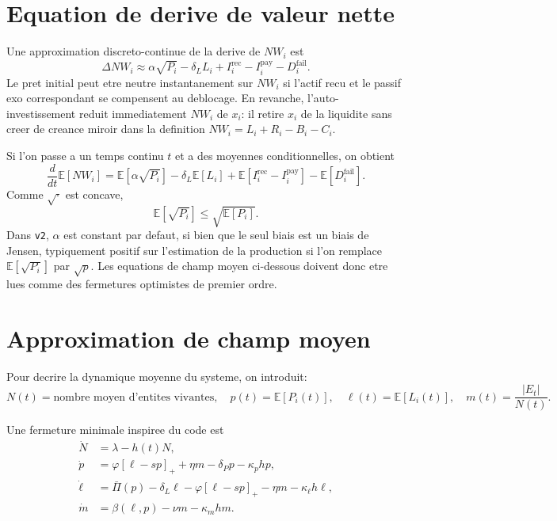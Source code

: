 \documentclass[11pt,a4paper]{article}
\begin{document}
\section{Equation de derive de valeur nette}
Une approximation discreto-continue de la derive de $NW_i$ est
\[
\Delta NW_i
\approx
\alpha\sqrt{P_i}
- \delta_L L_i
+ I_i^{\mathrm{rec}}
- I_i^{\mathrm{pay}}
- D_i^{\mathrm{fail}}.
\]
Le pret initial peut etre neutre instantanement sur $NW_i$ si l'actif recu et le passif exo correspondant se compensent au deblocage. En revanche, l'auto-investissement reduit immediatement $NW_i$ de $x_i$: il retire $x_i$ de la liquidite sans creer de creance miroir dans la definition $NW_i=L_i+R_i-B_i-C_i$.

Si l'on passe a un temps continu $t$ et a des moyennes conditionnelles, on obtient
\[
\frac{d}{dt}\mathbb{E}[NW_i]
=
\mathbb{E}[\alpha\sqrt{P_i}]
- \delta_L\mathbb{E}[L_i]
+ \mathbb{E}[I_i^{\mathrm{rec}}-I_i^{\mathrm{pay}}]
- \mathbb{E}[D_i^{\mathrm{fail}}].
\]
Comme $\sqrt{\cdot}$ est concave,
\[
\mathbb{E}[\sqrt{P_i}] \le \sqrt{\mathbb{E}[P_i]}.
\]
Dans \texttt{v2}, $\alpha$ est constant par defaut, si bien que le seul biais est un biais de Jensen, typiquement positif sur l'estimation de la production si l'on remplace $\mathbb{E}[\sqrt{P_i}]$ par $\sqrt{p}$. Les equations de champ moyen ci-dessous doivent donc etre lues comme des fermetures optimistes de premier ordre.

\section{Approximation de champ moyen}
Pour decrire la dynamique moyenne du systeme, on introduit:
\[
N(t) = \text{nombre moyen d'entites vivantes},\quad
p(t)=\mathbb{E}[P_i(t)],\quad
\ell(t)=\mathbb{E}[L_i(t)],\quad
m(t)=\frac{|E_t|}{N(t)}.
\]

Une fermeture minimale inspiree du code est
\begin{align*}
\dot N &= \lambda - h(t)N, \\
\dot p &= \varphi[\ell-sp]_+ + \eta m - \delta_P p - \kappa_p h p, \\
\dot \ell &= \bar \Pi(p) - \delta_L \ell - \varphi[\ell-sp]_+ - \eta m - \kappa_\ell h\ell, \\
\dot m &= \beta(\ell,p) - \nu m - \kappa_m h m.
\end{align*}
\end{document}
